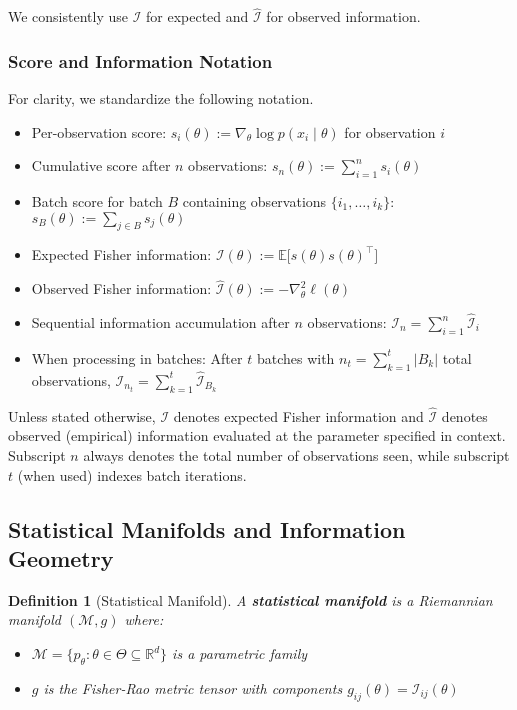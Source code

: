 \documentclass[11pt]{article}
\newtheorem{definition}[theorem]{Definition}
\begin{document}
We consistently use $\mathcal{I}$ for expected and $\hat{\mathcal{I}}$ for observed information.

\subsubsection{Score and Information Notation}
For clarity, we standardize the following notation.
\begin{itemize}
\item Per-observation score: $s_i(\theta) := \nabla_\theta \log p(x_i\mid \theta)$ for observation $i$
\item Cumulative score after $n$ observations: $s_n(\theta) := \sum_{i=1}^n s_i(\theta)$
\item Batch score for batch $B$ containing observations $\{i_1, \ldots, i_k\}$: $s_{B}(\theta) := \sum_{j\in B} s_j(\theta)$
\item Expected Fisher information: $\mathcal I(\theta) := \mathbb E\big[s(\theta)s(\theta)^\top\big]$
\item Observed Fisher information: $\hat{\mathcal I}(\theta) := -\nabla_\theta^2 \ell(\theta)$
\item Sequential information accumulation after $n$ observations: $\mathcal I_n = \sum_{i=1}^n \hat{\mathcal I}_i$
\item When processing in batches: After $t$ batches with $n_t = \sum_{k=1}^t |B_k|$ total observations, $\mathcal I_{n_t} = \sum_{k=1}^t \hat{\mathcal I}_{B_k}$
\end{itemize}
Unless stated otherwise, $\mathcal I$ denotes expected Fisher information and $\hat{\mathcal I}$ denotes observed (empirical) information evaluated at the parameter specified in context. Subscript $n$ always denotes the total number of observations seen, while subscript $t$ (when used) indexes batch iterations.

\subsection{Statistical Manifolds and Information Geometry}

\begin{definition}[Statistical Manifold]
A \textbf{statistical manifold} is a Riemannian manifold $(\mathcal{M}, g)$ where:
\begin{itemize}
\item $\mathcal{M} = \{p_\theta : \theta \in \Theta \subseteq \mathbb{R}^d\}$ is a parametric family
\item $g$ is the Fisher-Rao metric tensor with components $g_{ij}(\theta) = \mathcal{I}_{ij}(\theta)$
\end{itemize}
\end{definition}
\end{document}
